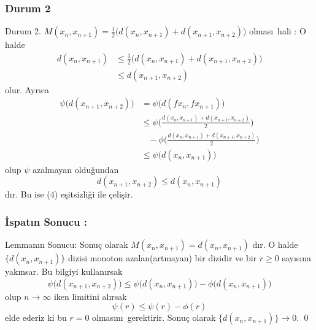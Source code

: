\documentclass[8pt]{beamer}
\begin{document}
\subsubsection{Durum 2} 
\begin{frame} 
  \begin{block}{Durum 2.  $M(x_n,x_{n+1})=\frac{1}{2}\big(d(x_n,x_{n+1})+d(x_{n+1},x_{n+2})\big)$ olmas\i\ hali :}
O halde 
      \begin{align}
        d(x_n,x_{n+1})&\leq \frac{1}{2}\big(d(x_n,x_{n+1})+d(x_{n+1},x_{n+2})\big)\\
                    &\leq d(x_{n+1},x_{n+2}) 
      \end{align}
olur. Ayr\i ca 
      \begin{align}
          \psi\big(d(x_{n+1},x_{n+2})\big) &=\psi \big(d(fx_{n},fx_{n+1})\big) \\
          &\leq \psi\bigg(\frac{d(x_n,x_{n+1})+d(x_{n+1},x_{n+2})}{2}\bigg) \\
          & \hspace{10pt}- \phi\bigg(\frac{d(x_n,x_{n+1})+d(x_{n+1},x_{n+2})}{2}\bigg) \\
          &\leq \psi\big(d(x_{n},x_{n+1})\big)
      \end{align}
olup $\psi $ azalmayan oldu\u{g}undan $$d(x_{n+1},x_{n+2})\leq d(x_n,x_{n+1})$$ d\i r. Bu ise (4) e\c{s}itsizli\u{g}i ile \c{c}eli\c{s}ir.
   \end{block}
\end{frame}%


\subsubsection{ \.{I}spat\i n Sonucu :} 
\begin{frame} 
  \begin{block}{Lemman\i n Sonucu:}
Sonu\c{c} olarak  $M(x_{n},x_{n+1})= d(x_n,x_{n+1})$ d\i r. O halde $\{d(x_n,x_{n+1})\}$ dizisi monoton azalan(artmayan) bir dizidir ve bir $r\geq 0$ say\i s\i na yak\i nsar. Bu bilgiyi kullan\i rsak $$\psi\big(d(x_{n+1},x_{n+2})\big)\leq \psi\big(d(x_{n},x_{n+1})\big)-\phi\big(d(x_{n},x_{n+1})\big)$$ olup $n\to \infty$ iken limitini al\i rsak $$\psi(r)\leq \psi(r)-\phi(r)$$ elde ederiz ki bu $r=0$ olmas\i n\i\ gerektirir. Sonu\c{c} olarak $\{d(x_n,x_{n+1})\}\to 0$. \qed
   \end{block}
\end{frame}%
\end{document}

